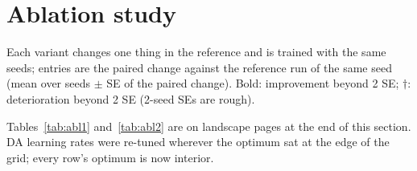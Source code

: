 \documentclass[10.5pt,a4paper]{article}
\begin{document}
\section{Ablation study}\label{sec:abl}

Each variant changes one thing in the reference and is trained with the same seeds; entries are
the paired change against the reference run of the same seed (mean over seeds $\pm$ SE of the
paired change). Bold: improvement beyond 2 SE; $\dagger$: deterioration beyond 2 SE (2-seed
SEs are rough).

Tables~\ref{tab:abl1} and~\ref{tab:abl2} are on landscape pages at the end of this section.
DA learning rates were re-tuned wherever the optimum sat at the edge of the grid; every row's
optimum is now interior.

\begin{landscape}
\begin{table}[p]
\centering\scriptsize
\caption{Ablations, \textbf{single decode}. MSE $\times10^{-3}$ (all frames), LSiM $\times10^{-1}$,
DA = mean over the 26 points of the four df9 sweeps (window length, number of observation
times, sparsity, noise).}
\label{tab:abl1}
\end{table}

\begin{table}[p]
\centering\scriptsize
\caption{Ablations, \textbf{mixture readout} (each checkpoint with its own train-calibrated
$\sigma$). DA is identical to Table~\ref{tab:abl1}. The dense and Hurwitz generators are absent:
the mixture rescales oscillator frequencies, which only the block generator has.}
\label{tab:abl2}
\end{table}
\end{landscape}
\end{document}
